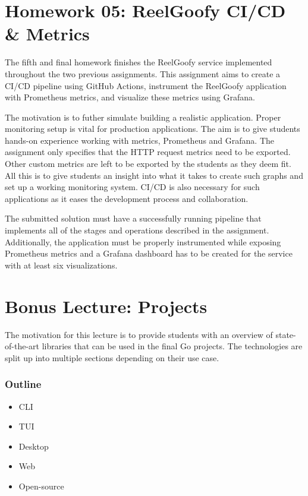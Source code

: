 \documentclass[
  digital,
  color,
  oneside,
  nosansbold,
  nocolorbold,
  nolof,
  nolot,
]{fithesis4}
\begin{document}
\section{Homework 05: ReelGoofy CI/CD \& Metrics}\label{reelgoofy-metrics}

The fifth and final homework finishes the ReelGoofy service implemented throughout the two previous assignments. This assignment aims to create a CI/CD pipeline using GitHub Actions, instrument the ReelGoofy application with Prometheus metrics, and visualize these metrics using Grafana.

The motivation is to futher simulate building a realistic application. Proper monitoring setup is vital for production applications. The aim is to give students hands-on experience working with metrics, Prometheus and Grafana. The assignment only specifies that the HTTP request metrics need to be exported. Other custom metrics are left to be exported by the students as they deem fit. All this is to give students an insight into what it takes to create such graphs and set up a working monitoring system. CI/CD is also necessary for such applications as it eases the development process and collaboration.

The submitted solution must have a successfully running pipeline that implements all of the stages and operations described in the assignment. Additionally, the application must be properly instrumented while exposing Prometheus metrics and a Grafana dashboard has to be created for the service with at least six visualizations.

\section{Bonus Lecture: Projects} \label{lecture-projects}

The motivation for this lecture is to provide students with an overview of state-of-the-art libraries that can be used in the final Go projects. The technologies are split up into multiple sections depending on their use case.

\subsubsection{Outline}

\begin{itemize}
    \item CLI
    \item TUI
    \item Desktop
    \item Web
    \item Open-source
\end{itemize}
\end{document}

